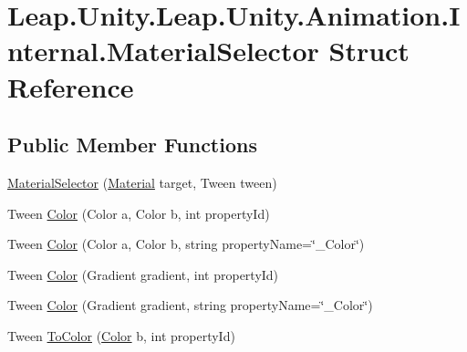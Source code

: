 \hypertarget{struct_leap_1_1_unity_1_1_leap_1_1_unity_1_1_animation_1_1_internal_1_1_material_selector}{}\section{Leap.\+Unity.\+Leap.\+Unity.\+Animation.\+Internal.\+Material\+Selector Struct Reference}
\label{struct_leap_1_1_unity_1_1_leap_1_1_unity_1_1_animation_1_1_internal_1_1_material_selector}
\subsection*{Public Member Functions}
\begin{DoxyCompactItemize}
\item 
\mbox{\hyperlink{struct_leap_1_1_unity_1_1_leap_1_1_unity_1_1_animation_1_1_internal_1_1_material_selector_a6ab9c747dd93cf00ef40f4ee3ab09af7}{Material\+Selector}} (\mbox{\hyperlink{struct_leap_1_1_unity_1_1_leap_1_1_unity_1_1_animation_1_1_internal_1_1_material_selector_acca452a6ebdd665db3e45f590437813b}{Material}} target, Tween tween)
\item 
Tween \mbox{\hyperlink{struct_leap_1_1_unity_1_1_leap_1_1_unity_1_1_animation_1_1_internal_1_1_material_selector_a4cee2e1cf1062ce91d3e8930fc5b838b}{Color}} (Color a, Color b, int property\+Id)
\item 
Tween \mbox{\hyperlink{struct_leap_1_1_unity_1_1_leap_1_1_unity_1_1_animation_1_1_internal_1_1_material_selector_aa03406144f977bb8ffe95719a3112e96}{Color}} (Color a, Color b, string property\+Name=\char`\"{}\+\_\+\+Color\char`\"{})
\item 
Tween \mbox{\hyperlink{struct_leap_1_1_unity_1_1_leap_1_1_unity_1_1_animation_1_1_internal_1_1_material_selector_a08fe1e65e6ad8268d4eed1f16215e534}{Color}} (Gradient gradient, int property\+Id)
\item 
Tween \mbox{\hyperlink{struct_leap_1_1_unity_1_1_leap_1_1_unity_1_1_animation_1_1_internal_1_1_material_selector_ad8c82d1df24cf2a0b7c68579fa08a2be}{Color}} (Gradient gradient, string property\+Name=\char`\"{}\+\_\+\+Color\char`\"{})
\item 
Tween \mbox{\hyperlink{struct_leap_1_1_unity_1_1_leap_1_1_unity_1_1_animation_1_1_internal_1_1_material_selector_ac4100253b4f48e77cdfbde5c3c8faf19}{To\+Color}} (\mbox{\hyperlink{struct_leap_1_1_unity_1_1_leap_1_1_unity_1_1_animation_1_1_internal_1_1_material_selector_a4cee2e1cf1062ce91d3e8930fc5b838b}{Color}} b, int property\+Id)

\end{DoxyCompactItemize}
